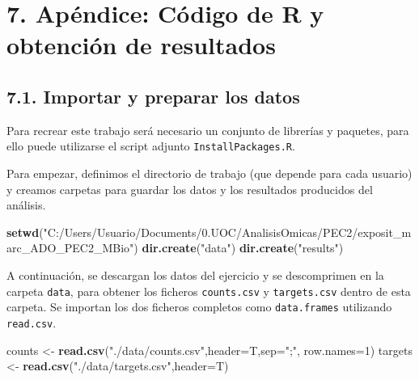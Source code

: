 \documentclass[
]{article}
\newenvironment{Shaded}{\begin{snugshade}}{\end{snugshade}}
\newcommand{\DataTypeTok}[1]{\textcolor[rgb]{0.13,0.29,0.53}{#1}}
\newcommand{\DecValTok}[1]{\textcolor[rgb]{0.00,0.00,0.81}{#1}}
\newcommand{\KeywordTok}[1]{\textcolor[rgb]{0.13,0.29,0.53}{\textbf{#1}}}
\newcommand{\NormalTok}[1]{#1}
\newcommand{\StringTok}[1]{\textcolor[rgb]{0.31,0.60,0.02}{#1}}
\begin{document}
\newpage

\hypertarget{apuxe9ndice-cuxf3digo-de-r-y-obtenciuxf3n-de-resultados}{%
\section{7. Apéndice: Código de R y obtención de
resultados}\label{apuxe9ndice-cuxf3digo-de-r-y-obtenciuxf3n-de-resultados}}

\hypertarget{importar-y-preparar-los-datos}{%
\subsection{7.1. Importar y preparar los
datos}\label{importar-y-preparar-los-datos}}

Para recrear este trabajo será necesario un conjunto de librerías y
paquetes, para ello puede utilizarse el script adjunto
\texttt{InstallPackages.R}.

Para empezar, definimos el directorio de trabajo (que depende para cada
usuario) y creamos carpetas para guardar los datos y los resultados
producidos del análisis.

\begin{Shaded}
\begin{Highlighting}[]
\KeywordTok{setwd}\NormalTok{(}\StringTok{"C:/Users/Usuario/Documents/0.UOC/AnalisisOmicas/PEC2/exposit_marc_ADO_PEC2_MBio"}\NormalTok{)}
\KeywordTok{dir.create}\NormalTok{(}\StringTok{"data"}\NormalTok{)}
\KeywordTok{dir.create}\NormalTok{(}\StringTok{"results"}\NormalTok{)}
\end{Highlighting}
\end{Shaded}

A continuación, se descargan los datos del ejercicio y se descomprimen
en la carpeta \texttt{data}, para obtener los ficheros
\texttt{counts.csv} y \texttt{targets.csv} dentro de esta carpeta. Se
importan los dos ficheros completos como \texttt{data.frames} utilizando
\texttt{read.csv}.

\begin{Shaded}
\begin{Highlighting}[]
\NormalTok{counts <-}\StringTok{  }\KeywordTok{read.csv}\NormalTok{(}\StringTok{"./data/counts.csv"}\NormalTok{,}\DataTypeTok{header=}\NormalTok{T,}\DataTypeTok{sep=}\StringTok{";"}\NormalTok{, }\DataTypeTok{row.names=}\DecValTok{1}\NormalTok{)}
\NormalTok{targets <-}\StringTok{ }\KeywordTok{read.csv}\NormalTok{(}\StringTok{"./data/targets.csv"}\NormalTok{,}\DataTypeTok{header=}\NormalTok{T)}
\end{Highlighting}
\end{Shaded}
\end{document}
